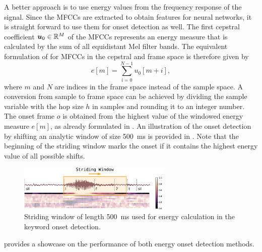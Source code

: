 A better approach is to use energy values from the frequency response of the signal.
Since the MFCCs are extracted to obtain features for neural networks, it is straight forward to use them for onset detection as well.
The first cepstral coefficient $\bm{u}_0 \in \mathbb{R}^M$ of the MFCCs represents an energy measure that is calculated by the sum of all equidistant Mel filter bands.
The equivalent formulation of  for MFCCs in the cepstral and frame space is therefore given by
\begin{equation}
  e[m] = \sum_{i=0}^{N-1} u_0[m + i],
\end{equation}
where $m$ and $N$ are indices in the frame space instead of the sample space.
A conversion from sample to frame space can be achieved by dividing the sample variable with the hop size $h$ in samples and rounding it to an integer number.
The onset frame $o$ is obtained from the highest value of the windowed energy measure $e[m]$, as already formulated in .
An illustration of the onset detection by shifting an analytic window of size \SI{500}{\milli\second} is provided in .
Note that the beginning of the striding window marks the onset if it contains the highest energy value of all possible shifts.
\begin{figure}[!ht]
  \centering
    \includegraphics[width=0.65\textwidth]{./3_signal/figs/signal_onset_window.pdf}
  \caption{Striding window of length \SI{500}{\milli\second} used for energy calculation in the keyword onset detection.}
  \label{fig:signal_onset_window}
\end{figure}
\FloatBarrier
\noindent
{} provides a showcase on the performance of both energy onset detection methods.
